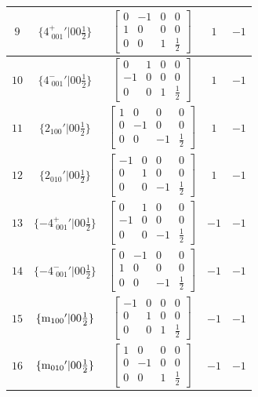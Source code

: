 \documentclass[fleqn,8pt]{jsarticle}
\begin{document}
\begin{longtable}{ccccc}
$ 9 $ & $ \{4^{+}_{\,\,001}{}'|0 0 \frac{1}{2}\} $ & $ \begin{bmatrix} 0 & -1 & 0 & 0 \\ 1 & 0 & 0 & 0 \\ 0 & 0 & 1 & \frac{1}{2} \end{bmatrix} $ & $ 1 $ & $ -1 $ \\ \hline
$ 10 $ & $ \{4^{-}_{\,\,001}{}'|0 0 \frac{1}{2}\} $ & $ \begin{bmatrix} 0 & 1 & 0 & 0 \\ -1 & 0 & 0 & 0 \\ 0 & 0 & 1 & \frac{1}{2} \end{bmatrix} $ & $ 1 $ & $ -1 $ \\ \hline
$ 11 $ & $ \{2{}_{100}{}'|0 0 \frac{1}{2}\} $ & $ \begin{bmatrix} 1 & 0 & 0 & 0 \\ 0 & -1 & 0 & 0 \\ 0 & 0 & -1 & \frac{1}{2} \end{bmatrix} $ & $ 1 $ & $ -1 $ \\ \hline
$ 12 $ & $ \{2{}_{010}{}'|0 0 \frac{1}{2}\} $ & $ \begin{bmatrix} -1 & 0 & 0 & 0 \\ 0 & 1 & 0 & 0 \\ 0 & 0 & -1 & \frac{1}{2} \end{bmatrix} $ & $ 1 $ & $ -1 $ \\ \hline
$ 13 $ & $ \{-4^{+}_{\,\,001}{}'|0 0 \frac{1}{2}\} $ & $ \begin{bmatrix} 0 & 1 & 0 & 0 \\ -1 & 0 & 0 & 0 \\ 0 & 0 & -1 & \frac{1}{2} \end{bmatrix} $ & $ -1 $ & $ -1 $ \\ \hline
$ 14 $ & $ \{-4^{-}_{\,\,001}{}'|0 0 \frac{1}{2}\} $ & $ \begin{bmatrix} 0 & -1 & 0 & 0 \\ 1 & 0 & 0 & 0 \\ 0 & 0 & -1 & \frac{1}{2} \end{bmatrix} $ & $ -1 $ & $ -1 $ \\ \hline
$ 15 $ & $ \{{\rm m}_{100}{}'|0 0 \frac{1}{2}\} $ & $ \begin{bmatrix} -1 & 0 & 0 & 0 \\ 0 & 1 & 0 & 0 \\ 0 & 0 & 1 & \frac{1}{2} \end{bmatrix} $ & $ -1 $ & $ -1 $ \\ \hline
$ 16 $ & $ \{{\rm m}_{010}{}'|0 0 \frac{1}{2}\} $ & $ \begin{bmatrix} 1 & 0 & 0 & 0 \\ 0 & -1 & 0 & 0 \\ 0 & 0 & 1 & \frac{1}{2} \end{bmatrix} $ & $ -1 $ & $ -1 $ \\
\end{longtable}
\end{document}
